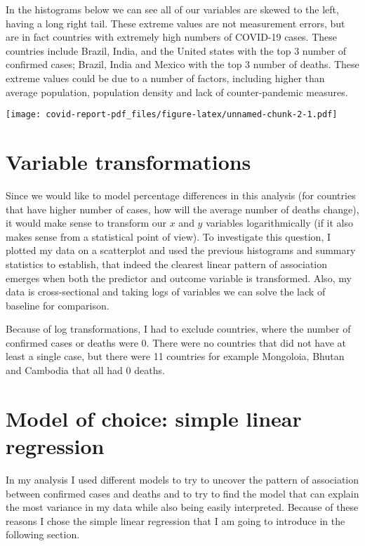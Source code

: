 \documentclass[
]{article}
\begin{document}
In the histograms below we can see all of our variables are skewed to
the left, having a long right tail. These extreme values are not
measurement errors, but are in fact countries with extremely high
numbers of COVID-19 cases. These countries include Brazil, India, and
the United states with the top 3 number of confirmed cases; Brazil,
India and Mexico with the top 3 number of deaths. These extreme values
could be due to a number of factors, including higher than average
population, population density and lack of counter-pandemic measures.

\texttt{[image: covid-report-pdf\_files/figure-latex/unnamed-chunk-2-1.pdf]}

\hypertarget{variable-transformations}{%
\section{Variable transformations}\label{variable-transformations}}

Since we would like to model percentage differences in this analysis
(for countries that have higher number of cases, how will the average
number of deaths change), it would make sense to transform our \(x\) and
\(y\) variables logarithmically (if it also makes sense from a
statistical point of view). To investigate this question, I plotted my
data on a scatterplot and used the previous histograms and summary
statistics to establish, that indeed the clearest linear pattern of
association emerges when both the predictor and outcome variable is
transformed. Also, my data is cross-sectional and taking logs of
variables we can solve the lack of baseline for comparison.

Because of log transformations, I had to exclude countries, where the
number of confirmed cases or deaths were 0. There were no countries that
did not have at least a single case, but there were 11 countries for
example Mongoloia, Bhutan and Cambodia that all had 0 deaths.

\hypertarget{model-of-choice-simple-linear-regression}{%
\section{Model of choice: simple linear
regression}\label{model-of-choice-simple-linear-regression}}

In my analysis I used different models to try to uncover the pattern of
association between confirmed cases and deaths and to try to find the
model that can explain the most variance in my data while also being
easily interpreted. Because of these reasons I chose the simple linear
regression that I am going to introduce in the following section.
\end{document}
